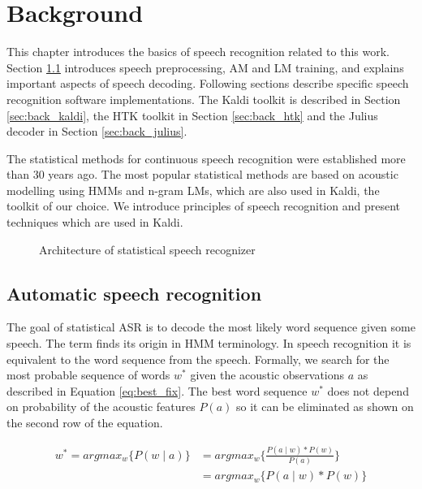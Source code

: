 \chapter{Background}
\label{cha:background}
This chapter introduces the basics of speech recognition related to this work. Section \ref{sec:back_asr} introduces speech preprocessing, \acf{AM} and \acf{LM} training, and explains important aspects of speech decoding. Following sections describe specific speech recognition software implementations. The Kaldi toolkit is described in Section \ref{sec:back_kaldi}, the \ac{HTK} toolkit in Section \ref{sec:back_htk} and the Julius decoder in Section \ref{sec:back_julius}.

The statistical methods for continuous speech recognition were established more than 30 years ago. The most popular statistical methods are based on acoustic modelling using \acp{HMM} and n-gram \acp{LM}, which are also used in Kaldi, the toolkit of our choice. We introduce principles of speech recognition and present techniques which are used in Kaldi. 

\begin{figure}[!htp]
  \begin{center}
    
    \caption{Architecture of statistical speech recognizer\cite{ney1990acoustic}}
    \label{fig:components} 
  \end{center}
\end{figure}

\section{Automatic speech recognition}
\label{sec:back_asr}

The goal of statistical \ac{ASR} is to decode the most likely word sequence given some speech. The term  finds its origin in \acs{HMM} terminology. In speech recognition it is equivalent to  the word sequence from the speech. Formally, we search for the most probable sequence of words $w^*$ given the acoustic observations $a$ as described in Equation \ref{eq:best_fix}. The best word sequence $w^*$ does not depend on probability of the acoustic features $P(a)$ so it can be eliminated as shown on the second row of the equation.

\begin{equation}
  \label{eq:best_fix}
  \begin{split}
    w^* = argmax_{w}\{P(w \mid a)\} &= argmax_{w}\{\frac{P(a \mid w) * P(w)}{P(a)}\} \\
                                   &= argmax_{w}\{P(a \mid w) * P(w)\}
  \end{split}
\end{equation}


